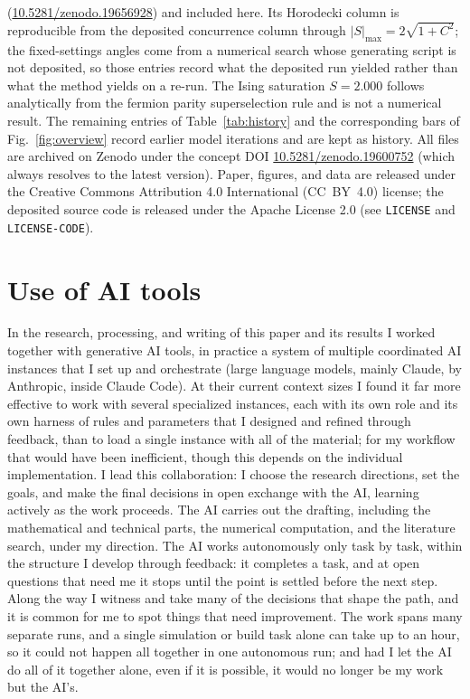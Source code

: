 \documentclass[aps,pra,twocolumn,superscriptaddress,showpacs,floatfix]{revtex4-2}
\begin{document}
(\href{https://doi.org/10.5281/zenodo.19656928}{10.5281/zenodo.19656928}) and
included here. Its Horodecki column is reproducible from the deposited
concurrence column through $|S|_{\max} = 2\sqrt{1+C^2}$; the fixed-settings
angles come from a numerical search whose generating script is not deposited,
so those entries record what the deposited run yielded rather than what the
method yields on a re-run. The Ising
saturation $S = 2.000$ follows analytically from the fermion parity
superselection rule and is not a numerical result. The remaining entries of
Table~\ref{tab:history} and the corresponding bars of Fig.~\ref{fig:overview}
record earlier model iterations and are kept as history. All files are
archived on Zenodo under the concept DOI
\href{https://doi.org/10.5281/zenodo.19600752}{10.5281/zenodo.19600752} (which
always resolves to the latest version). Paper, figures, and data are released
under the Creative Commons Attribution 4.0 International (CC~BY~4.0) license;
the deposited source code is released under the Apache License 2.0 (see
\texttt{LICENSE} and \texttt{LICENSE-CODE}).

\section*{Use of AI tools}

In the research, processing, and writing of this paper and its results I worked together with generative AI tools, in practice a system of multiple coordinated AI instances that I set up and orchestrate (large language models, mainly Claude, by Anthropic, inside Claude Code). At their current context sizes I found it far more effective to work with several specialized instances, each with its own role and its own harness of rules and parameters that I designed and refined through feedback, than to load a single instance with all of the material; for my workflow that would have been inefficient, though this depends on the individual implementation. I lead this collaboration: I choose the research directions, set the goals, and make the final decisions in open exchange with the AI, learning actively as the work proceeds. The AI carries out the drafting, including the mathematical and technical parts, the numerical computation, and the literature search, under my direction. The AI works autonomously only task by task, within the structure I develop through feedback: it completes a task, and at open questions that need me it stops until the point is settled before the next step. Along the way I witness and take many of the decisions that shape the path, and it is common for me to spot things that need improvement. The work spans many separate runs, and a single simulation or build task alone can take up to an hour, so it could not happen all together in one autonomous run; and had I let the AI do all of it together alone, even if it is possible, it would no longer be my work but the AI's.
\end{document}
